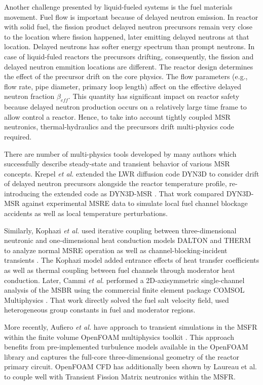 Another challenge presented by liquid-fueled systems is the fuel materials movement. Fuel flow is important because of delayed neutron emission. In reactor with solid fuel, the fission product delayed neutron precursors remain very close to the location where fission happened, later emitting delayed neutrons at that location. Delayed neutrons has softer energy spectrum than prompt neutrons. In case of liquid-fuled reactors the precursors drifting, consequently, the fission and delayed neutron emmition locations are different. The reactor design determines the effect of the precursor drift on the core physics. The flow parameters (e.g., flow rate, pipe diameter, primary loop length) affect on the effective delayed neutron fraction $\beta_{eff}$. This quantity has significant impact on reactor safety because delayed neutron production occurs on a relatively large time frame to allow control a reactor. Hence, to take into account tightly coupled \gls{MSR} neutronics, thermal-hydraulics and the precursors drift multi-physics code required.

There are number of multi-physics tools developed by many authors which successfully describe steady-state and transient behavior of various \gls{MSR} concepts. Krepel \emph{et al.} extended the \gls{LWR} diffusion code DYN3D to consider drift of delayed neutron precursors alongside the reactor temperature profile, re-introducing the extended code as DYN3D-MSR \cite{krepel_dyn3d-msr_2007}. That work compared DYN3D-MSR against experimental \gls{MSRE} data to simulate local fuel channel blockage accidents as well as local temperature perturbations.

Similarly, Kophazi \emph{et al.} used iterative coupling between three-dimensional neutronic and one-dimensional heat conduction models DALTON and THERM to analyze normal \gls{MSRE} operation as well as channel-blocking-incident transients \cite{kophazi_development_2009}. The Kophazi model added entrance effects of heat transfer coefficients as well as thermal coupling between fuel channels through moderator heat conduction. Later, Cammi \emph{et al.} performed a 2D-axisymmetric single-channel analysis of the \gls{MSBR} using the commercial finite element package COMSOL Multiphysics \cite{cammi_multi-physics_2011}. That work directly solved the fuel salt velocity field, used heterogeneous group constants in fuel and moderator regions.  

More recently, Aufiero \emph{et al.} \cite{aufiero_development_2014} have approach to transient simulations in the \gls{MSFR} within the finite volume
OpenFOAM multiphysics toolkit \cite{weller_tensorial_1998}.  This approach
benefits from pre-implemented turbulence models available in the OpenFOAM
library and captures the full-core three-dimensional geometry of the reactor
primary circuit.  OpenFOAM \gls{CFD} has additionally been shown by Laureau et
al. \cite{laureau_transient_2017} to couple well with Transient Fission Matrix
neutronics within the \gls{MSFR}.


